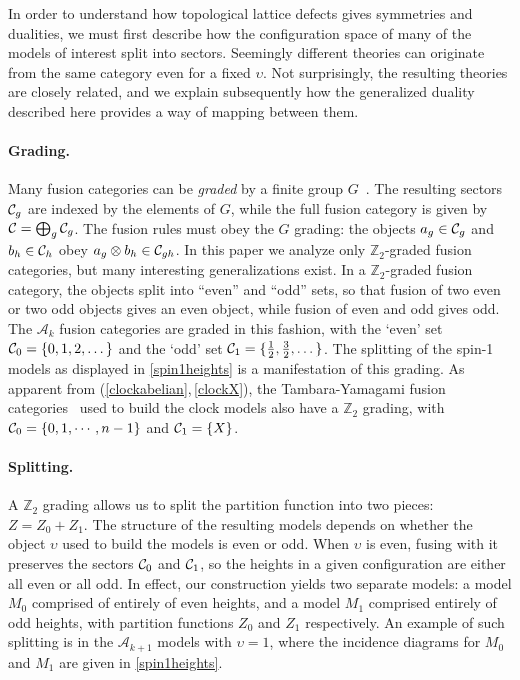 In order to understand how topological lattice defects gives symmetries and dualities, we must first describe how the configuration space of many of the models of interest split into sectors.
Seemingly different theories can originate from the same category even for a fixed $\upsilon$.
Not surprisingly, the resulting theories are closely related, and we explain subsequently how the generalized duality described here provides a way of mapping between them.

\paragraph{Grading.}

Many fusion categories can be {\em graded} by a finite group $G$~\cite{Etingof_2010,Barkeshli2019}.
The resulting sectors $\mathcal{C}_g$ are indexed by the elements of $G$, while the full fusion category is given by $\mathcal{C} = \bigoplus_g \mathcal{C}_g$. The fusion rules must obey the $G$ grading: the objects $a_g\in \mathcal{C}_g$ and $b_h\in \mathcal{C}_h$ obey $a_g \otimes b_h \in \mathcal{C}_{gh}$. 
In this paper we analyze only $\mathbb{Z}_2$-graded fusion categories, but many interesting generalizations exist. 
In a $\mathbb{Z}_2$-graded fusion category, the objects split into ``even'' and ``odd'' sets, so that fusion of two even or two odd objects gives an even object, while fusion of even and odd gives odd. 
The $\mathcal{A}_k$ fusion categories are graded in this fashion, with the `even' set $\mathcal{C}_{0} = \{ 0,1,2,\dots \}$ and the `odd' set $\mathcal{C}_{1} = \{ \frac12, \frac32, \dots \}$.
The splitting of the spin-1 models as displayed in \eqref{spin1heights} is a manifestation of this grading.
As apparent from (\ref{clockabelian},\,\ref{clockX}), the Tambara-Yamagami fusion categories~\cite{Tambara1998} used to build the clock models also have a $\mathbb{Z}_2$ grading,  with $\mathcal{C}_0 = \{ 0,1,\cdots, n-1\}$ and $\mathcal{C}_1 = \{ X \}$.





\paragraph{Splitting.}
A $\mathbb{Z}_2$ grading allows us to split the partition function into two pieces: $Z=Z_0 + Z_1$.  
The structure of the resulting models depends on whether the object $\upsilon$ used to build the models is even or odd. When $\upsilon$ is even, fusing with it preserves the sectors $\mathcal{C}_0$ and $\mathcal{C}_1$, so the heights in a given configuration are either all even or all odd. In effect, our construction yields two separate models: a model $M_0$ comprised of entirely of even heights, and a model $M_1$ comprised entirely of odd heights, with partition functions $Z_0$ and $Z_1$ respectively. An example of such splitting is in the $\mathcal{A}_{k+1}$ models with $\upsilon=1$, where the incidence diagrams for $M_0$ and $M_1$ are given in \eqref{spin1heights}. 

